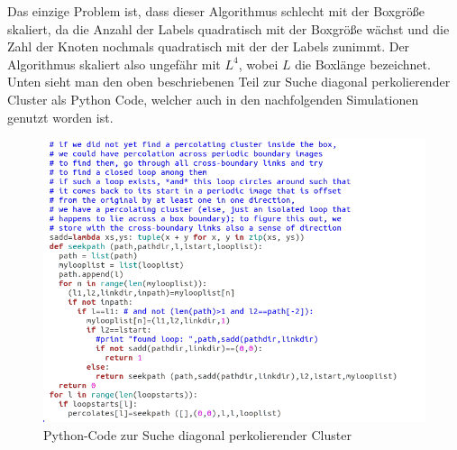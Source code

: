 \documentclass[a4paper, 12pt]{report}
\begin{document}
\clearpage

\noindent Das einzige Problem ist, dass dieser Algorithmus schlecht mit der Boxgröße skaliert, da die Anzahl der Labels quadratisch mit der Boxgröße wächst und die Zahl der Knoten nochmals quadratisch mit der der Labels zunimmt. Der Algorithmus skaliert also ungefähr mit $L^4$, wobei $L$ die Boxlänge bezeichnet. Unten sieht man den oben beschriebenen Teil zur Suche diagonal perkolierender Cluster als Python Code, welcher auch in den nachfolgenden Simulationen genutzt worden ist.


\begin{figure}[h!]
	\centering
	\includegraphics[scale=0.9]{diagcode.png}
	\caption{Python-Code zur Suche diagonal perkolierender Cluster}
\end{figure}

\clearpage
\end{document}
